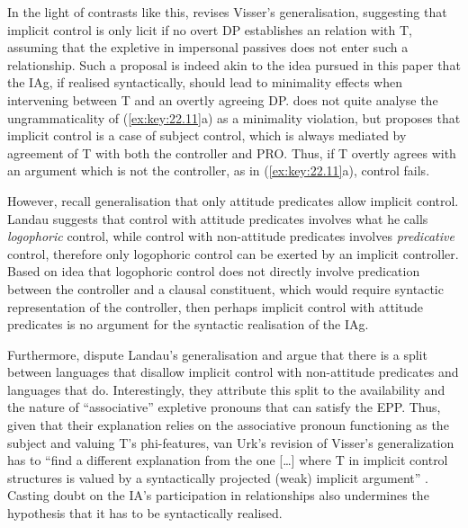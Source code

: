 \documentclass[output=paper]{langsci/langscibook}
\begin{document}
In the light of contrasts like this, \textcite{vanUrk2013} revises Visser’s
generalisation, suggesting that implicit control
is only licit if no overt DP establishes an  relation with T,
assuming that the expletive in impersonal passives does not
enter such a relationship. Such a proposal is indeed akin to the idea pursued
in this paper that the \gls{IAg}, if realised
syntactically, should lead to minimality effects when intervening between T and
an overtly agreeing DP. \Textcite{vanUrk2013} does not quite analyse the
ungrammaticality of (\ref{ex:key:22.11}a) as a minimality violation, but
proposes that implicit control is a case of subject control, which is always
mediated by agreement of T with both the controller and PRO. Thus, if T overtly
agrees with an argument which is not the controller, as in
(\ref{ex:key:22.11}a), control fails.

However, recall  generalisation that only attitude
predicates allow implicit control. Landau suggests that control with attitude
predicates involves what he calls \emph{logophoric} control, while control with
non-attitude predicates involves \emph{predicative} control, therefore only
logophoric control can be exerted by an implicit controller. Based on
 idea that logophoric control does not directly involve
predication between the controller and a clausal constituent, which would
require syntactic representation of the controller, then perhaps implicit
control with attitude predicates is no argument for the syntactic realisation
of the \gls{IAg}.

Furthermore, \citet{PitteroffSchafer2017} dispute Landau’s generalisation and
argue that there is a split between languages that disallow implicit control
with non-attitude predicates and languages that do. Interestingly, they
attribute this split to the availability and the nature of
\enquote{associative} expletive pronouns that can satisfy the
\gls{EPP}. Thus, given that their explanation relies on the
associative pronoun functioning as the subject and valuing T’s phi-features,
van Urk’s revision of Visser’s generalization has to “find a different
explanation from the one [\dots{}] where T in implicit control structures is
valued by a syntactically projected (weak) implicit argument”
\parencite[38--39]{PitteroffSchafer2017}. Casting doubt on the IA’s
participation in  relationships also undermines the hypothesis that it has
to be syntactically realised.
\end{document}
